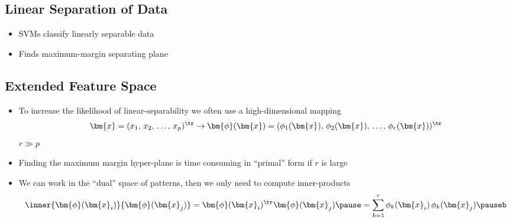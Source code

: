
\begin{slide}
\section[-2]{Linear Separation of Data}

\pb
\begin{itemize}
\item SVMs classify linearly separable data\pause{}
  \begin{center}
    \pause
  \end{center}
\item Finds maximum-margin separating plane\pauseb
\end{itemize}

\end{slide}


\begin{slide}
\section[-2]{Extended Feature Space}

\begin{PauseHighLight}
  \begin{itemize}
  \item To increase the likelihood of linear-separability we often use a
    high-dimensional mapping
    \begin{align*}
      \bm{x}=(x_1,\,x_2,\,\ldots,\,x_p)^\tr \rightarrow \bm{\phi}(\bm{x}) =
      (\phi_1(\bm{x}),\,\phi_2(\bm{x}),\,\ldots,\,
      \phi_r(\bm{x}))^\tr
    \end{align*}
    $r\gg p$\pause
  \item Finding the maximum margin hyper-plane is time consuming in
    ``primal'' form if $r$ is large\pause
  \item We can work in the ``dual'' space of patterns, then we only need to
    compute inner-products
    \begin{align*}
      \inner{\bm{\phi}(\bm{x}_i)}{\bm{\phi}(\bm{x}_j)} =
      \bm{\phi}(\bm{x}_i)^\tr \bm{\phi}(\bm{x}_j)  \pause
      =  \sum_{k=1}^r \phi_k(\bm{x}_i) \, \phi_k(\bm{x}_j)\pauseb
    \end{align*}
  \end{itemize}
\end{PauseHighLight}

\end{slide}

